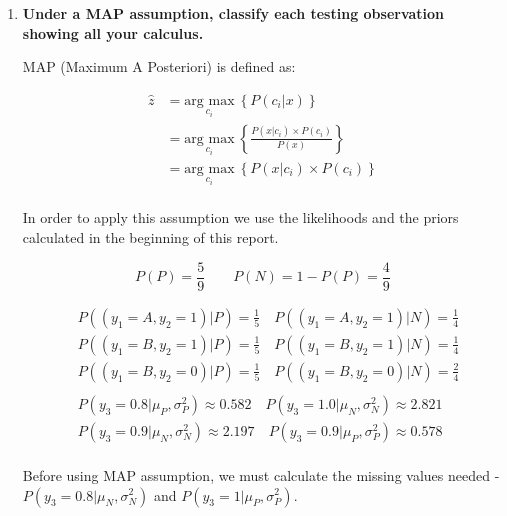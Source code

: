 \documentclass[12pt]{article}
\begin{document}
\begin{enumerate}[leftmargin=\labelsep]
    \item \textbf{Under a MAP assumption, classify each testing observation showing all your
    calculus.}

    \vspace{10pt}
    MAP (Maximum A Posteriori) is defined as:
    
    \begin{equation}\label{map}
        \begin{aligned}
          \hat{z} & = \underset{c_i}{\text{arg max}} \medspace \left\{P(c_i | x)\right\} \\
                  & = \underset{c_i}{\text{arg max}} \medspace \left\{\frac{P(x | c_i)  \times P(c_i)}{P(x)}\right\} \\
                  & = \underset{c_i}{\text{arg max}} \medspace \left\{P(x | c_i)  \times P(c_i)\right\} \\
        \end{aligned}
    \end{equation}

    \newpage
    In order to apply this assumption we use the likelihoods and the priors calculated in the beginning of this report.

    \begin{equation*}
        P(P) = \frac{5}{9} \quad \quad P(N) = 1- P(P) = \frac{4}{9} 
    \end{equation*}

    \begin{equation*}
        \begin{aligned}
        &P((y_1 = A, y_2 = 1)|P) = \frac{1}{5} \quad P((y_1 = A, y_2 = 1)|N) = \frac{1}{4}\\
        &P((y_1 = B, y_2 = 1)|P) = \frac{1}{5} \quad P((y_1 = B, y_2 = 1)|N) = \frac{1}{4}\\
        &P((y_1 = B, y_2 = 0)|P) = \frac{1}{5} \quad P((y_1 = B, y_2 = 0)|N) = \frac{2}{4}\\
        \\
        &P(y_3 = 0.8|\mu_P, \sigma_P^2) \approx 0.582 \quad P(y_3 = 1.0|\mu_N, \sigma_N^2) \approx 2.821\\
        &P(y_3 = 0.9|\mu_N, \sigma_N^2) \approx 2.197 \quad P(y_3 = 0.9|\mu_P, \sigma_P^2) \approx 0.578\\
        \end{aligned}
    \end{equation*}

    \vspace{10pt}
    Before using MAP assumption, we must calculate the missing values needed - $P(y_3 = 0.8|\mu_N, \sigma_N^2)$ and $P(y_3 = 1|\mu_P, \sigma_P^2)$.


\end{enumerate}
\end{document}
